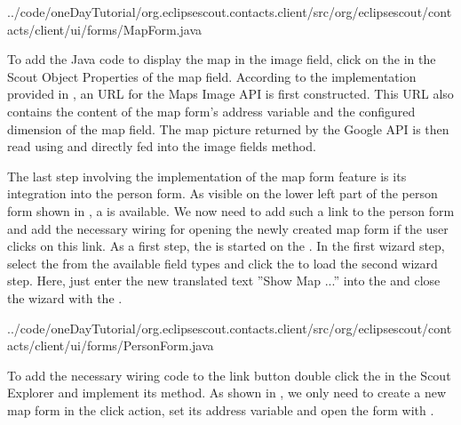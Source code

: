 \documentclass[a4paper,10pt,twoside]{book}
\begin{document}

{../code/oneDayTutorial/org.eclipsescout.contacts.client/src/org/eclipsescout/contacts/client/ui/forms/MapForm.java}

To add the Java code to display the map in the image field, click on the  in the Scout Object Properties of the map field. 
According to the implementation provided in , an URL for the Maps Image API is first constructed. 
This URL also contains the content of the map form's address variable and the configured dimension of the map field. 
The map picture returned by the Google API is then read using  and directly fed into the image fields  method. 

The last step involving the implementation of the map form feature is its integration into the person form. 
As visible on the lower left part of the person form shown in , a  is available. 
We now need to add such a link to the person form and add the necessary wiring for opening the newly created map form if the user clicks on this link. 
As a first step, the  is started on the . 
In the first wizard step, select the  from the available field types and click the  to load the second wizard step. 
Here, just enter the new translated text ''Show Map ...'' into the  and close the wizard with the . 


{../code/oneDayTutorial/org.eclipsescout.contacts.client/src/org/eclipsescout/contacts/client/ui/forms/PersonForm.java}

To add the necessary wiring code to the link button double click the  in the Scout Explorer and implement its  method.
As shown in , we only need to create a new map form in the click action, set its address variable and open the form with .
\end{document}
